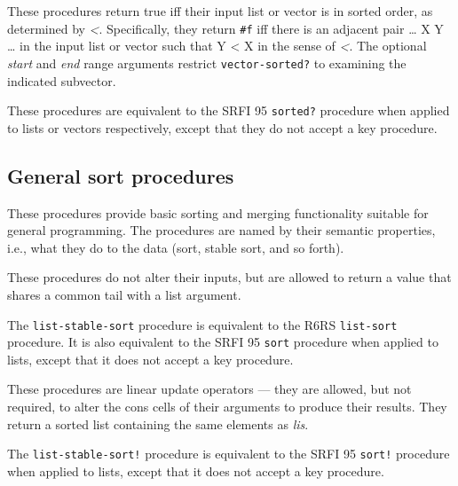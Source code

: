 \begin{entry}{%
  }

  These procedures return true iff their input list or vector is in
  sorted order, as determined by \emph{\textless{}}. Specifically,
  they return \texttt{\#f} iff there is an adjacent pair \ldots{} X Y
  \ldots{} in the input list or vector such that Y \textless{} X in
  the sense of \emph{\textless{}}. The optional \emph{start} and
  \emph{end} range arguments restrict \texttt{vector-sorted?} to
  examining the indicated subvector.

  These procedures are equivalent to the SRFI 95 \texttt{sorted?}
  procedure when applied to lists or vectors respectively, except that
  they do not accept a key procedure.
\end{entry}
\subsection{General sort procedures}\label{Generalsortprocedures}

These procedures provide basic sorting and merging functionality
suitable for general programming. The procedures are named by their
semantic properties, i.e., what they do to the data (sort, stable sort,
and so forth).


\begin{entry}{%
  }

  These procedures do not alter their inputs, but are allowed to
  return a value that shares a common tail with a list argument.

  The \texttt{list-stable-sort} procedure is equivalent to the R6RS
  \texttt{list-sort} procedure. It is also equivalent to the SRFI 95
  \texttt{sort} procedure when applied to lists, except that it does
  not accept a key procedure.
\end{entry}

\begin{entry}{%
  }

  These procedures are linear update operators --- they are allowed,
  but not required, to alter the cons cells of their arguments to
  produce their results. They return a sorted list containing the same
  elements as \emph{lis}.

  The \texttt{list-stable-sort!} procedure is equivalent to the SRFI
  95 \texttt{sort!} procedure when applied to lists, except that it
  does not accept a key procedure.
\end{entry}


